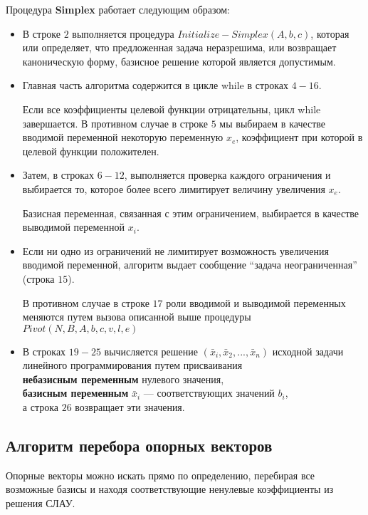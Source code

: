 \documentclass[../body.tex]{subfiles}
\begin{document}
Процедура \textbf{Simplex} работает следующим образом:
\begin{itemize}
	\item В строке $2$ выполняется процедура $Initialize-Simplex(A,b,c)$, которая или определяет, что предложенная задача неразрешима, или возвращает каноническую форму, базисное решение которой является допустимым.
	\item Главная часть алгоритма содержится в цикле while в строках $4-16$. 
	
	Если все коэффициенты целевой функции отрицательны, цикл while завершается. В противном случае в строке $5$ мы выбираем в качестве вводимой переменной некоторую переменную $x_{e}$, коэффициент при которой в целевой функции положителен.
	\item  Затем, в строках $6-12$, выполняется проверка каждого ограничения и выбирается то,
	которое более всего лимитирует величину увеличения  $x_{e}$. 
	
	Базисная переменная, связанная с этим
	ограничением, выбирается в качестве выводимой переменной  $x_{i}$.
	\item 
	Если ни одно из ограничений не лимитирует возможность увеличения вводимой переменной, алгоритм выдает сообщение “задача неограниченная” (строка $15$). 
	
	В противном случае в строке $17$ роли вводимой и выводимой переменных
	меняются путем вызова описанной выше процедуры  $Pivot(N,B,A,b,c,v, l, e)$
	\item 
	В строках $19-25$ вычисляется решение $(\bar{x}_{i}, \bar{x}_{2}, ... , \bar{x}_{n})$ исходной задачи линейного
	программирования путем присваивания \\ \textbf{небазисным переменным} нулевого
	значения, \\\textbf{базисным переменным}  $\bar{x}_{i}$ — соответствующих значений $b_{i}$,\\ а строка $26$ возвращает эти значения.
	
\end{itemize}


	\subsection{Алгоритм перебора опорных векторов}
	Опорные векторы можно искать прямо по определению, перебирая все возможные базисы и находя соответствующие ненулевые коэффициенты из решения СЛАУ. 
	\vspace{\baselineskip}
	
\end{document}
